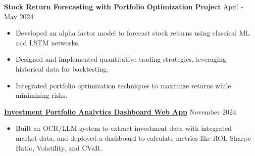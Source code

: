 \documentclass[a4paper, 11pt]{article}
\begin{document}
\textbf{Stock Return Forecasting with Portfolio Optimization Project} \hfill April - May 2024
\begin{itemize}[noitemsep, topsep=0pt, partopsep=0pt, parsep=0pt, leftmargin=20pt]
    \item Developed an alpha factor model to forecast stock returns using classical ML and LSTM networks.
    \item Designed and implemented quantitative trading strategies, leveraging historical data for backtesting.
    \item Integrated portfolio optimization techniques to maximize returns while minimizing risks.
\end{itemize}

\vspace{3pt}


\vspace{3pt}

\href{https://investment-portfoliogit-kan92h8iyt5covyupaxqo7.streamlit.app/}{\textbf{Investment Portfolio Analytics Dashboard Web App}} \hfill November 2024
\begin{itemize}[noitemsep, topsep=0pt, partopsep=0pt, parsep=0pt, leftmargin=20pt]
    \item Built an OCR/LLM system to extract investment data with integrated market data, and deployed a dashboard to calculate metrics like ROI, Sharpe Ratio, Volatility, and CVaR.
\end{itemize}
\vspace{3pt}
\end{document}
